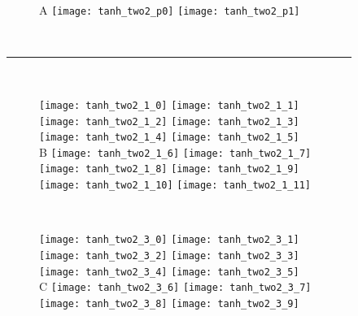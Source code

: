\vfill

\newpage
\null
\vfill

\begin{figure}[H]
    \begin{subfigure}{\textwidth}
      \hspace{1em}
      \textsf{A}
      \texttt{[image: tanh\_two2\_p0]}
      \texttt{[image: tanh\_two2\_p1]}
    \end{subfigure}\\[1em]
  \hspace*{2.2em}\rule{0.95\textwidth}{1.8pt}\\[1em]
    \begin{subfigure}{\textwidth}
      \hspace{2em}
      \texttt{[image: tanh\_two2\_1\_0]}
      \texttt{[image: tanh\_two2\_1\_1]}
      \texttt{[image: tanh\_two2\_1\_2]}
      \texttt{[image: tanh\_two2\_1\_3]}
      \texttt{[image: tanh\_two2\_1\_4]}
      \texttt{[image: tanh\_two2\_1\_5]}\\
      \hspace*{1em}
      \textsf{B}
      \texttt{[image: tanh\_two2\_1\_6]}
      \texttt{[image: tanh\_two2\_1\_7]}
      \texttt{[image: tanh\_two2\_1\_8]}
      \texttt{[image: tanh\_two2\_1\_9]}
      \texttt{[image: tanh\_two2\_1\_10]}
      \texttt{[image: tanh\_two2\_1\_11]}
    \end{subfigure}\\[0.6em]
    \begin{subfigure}{\textwidth}
      \hspace{2em}
      \texttt{[image: tanh\_two2\_3\_0]}
      \texttt{[image: tanh\_two2\_3\_1]}
      \texttt{[image: tanh\_two2\_3\_2]}
      \texttt{[image: tanh\_two2\_3\_3]}
      \texttt{[image: tanh\_two2\_3\_4]}
      \texttt{[image: tanh\_two2\_3\_5]}\\
      \hspace*{1em}
      \textsf{C}
      \texttt{[image: tanh\_two2\_3\_6]}
      \texttt{[image: tanh\_two2\_3\_7]}
      \texttt{[image: tanh\_two2\_3\_8]}
      \texttt{[image: tanh\_two2\_3\_9]}

\end{subfigure}
\end{figure}
